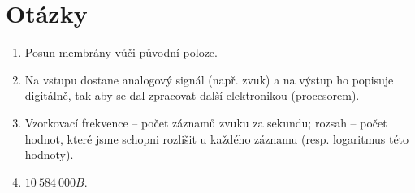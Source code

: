 \documentclass[12pt,a4paper]{article}
\begin{document}
\section{Otázky}
\begin{enumerate}
	\item Posun membrány vůči původní poloze.
	\item Na vstupu dostane analogový signál (např. zvuk) a na výstup ho popisuje digitálně, tak aby se dal zpracovat další elektronikou (procesorem).
	\item Vzorkovací frekvence -- počet záznamů zvuku za sekundu; rozsah -- počet hodnot, které jsme schopni rozlišit u každého záznamu (resp. logaritmus této hodnoty).
	\item $10\ 584\ 000 B$.
\end{enumerate}
\end{document}
